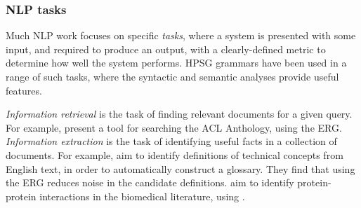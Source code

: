 \documentclass[output=paper,nonflat]{langsci/langscibook}
\begin{document}
\subsubsection{NLP tasks}
\label{cl:downstream:nlp}


Much NLP work focuses on specific \textit{tasks},
where a system is presented with some input,
and required to produce an output,
with a clearly-defined metric to determine how well the system performs.
HPSG grammars have been used in a range of such tasks,
where the syntactic and semantic analyses provide useful features.

\textit{Information retrieval}
is the task of finding relevant documents for a given query.
For example, \citet{schaefer2011acl} present a tool for searching the ACL Anthology, using the ERG.
\textit{Information extraction}
is the task of identifying useful facts in a collection of documents.
For example, \citet{reiplinger2012glossary} aim to identify definitions of technical concepts from English text,
in order to automatically construct a glossary.
They find that using the ERG reduces noise in the candidate definitions.
\citet{miyao2008protein} aim to identify protein-protein interactions in the  biomedical literature, using .
\end{document}
